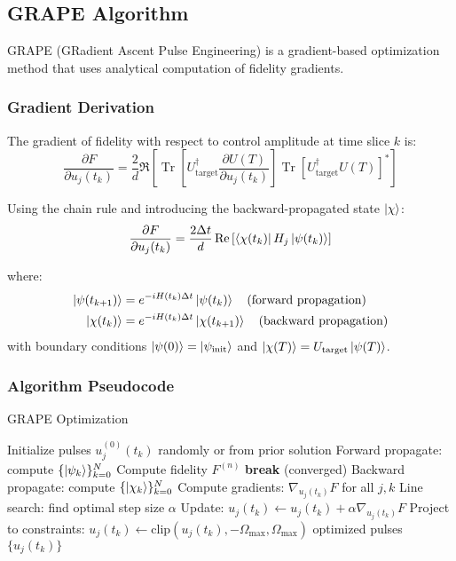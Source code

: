 \documentclass[11pt,a4paper]{article}
\theoremstyle{definition}
\theoremstyle{remark}
\renewcommand{\Tr}{\operatorname{Tr}}
\begin{document}
\subsection{GRAPE Algorithm}

GRAPE (GRadient Ascent Pulse Engineering) is a gradient-based optimization method that uses analytical computation of fidelity gradients.

\subsubsection{Gradient Derivation}

The gradient of fidelity with respect to control amplitude at time slice $k$ is:
\begin{equation}
\frac{\partial F}{\partial u_j(t_k)} = \frac{2}{d}\Re\left[\Tr\left[U_{\text{target}}^\dagger \frac{\partial U(T)}{\partial u_j(t_k)}\right]\Tr\left[U_{\text{target}}^\dagger U(T)\right]^*\right]
\end{equation}

Using the chain rule and introducing the backward-propagated state $\ket{\chi}$:
\begin{equation}
\frac{\partial F}{\partial u_j(t_k)} = \frac{2\Delta t}{d}\Re\left[\bra{\chi(t_k)}H_j\ket{\psi(t_k)}\right]
\end{equation}

where:
\begin{align}
\ket{\psi(t_{k+1})} &= e^{-iH(t_k)\Delta t}\ket{\psi(t_k)} \quad \text{(forward propagation)} \\
\ket{\chi(t_k)} &= e^{-iH(t_k)\Delta t}\ket{\chi(t_{k+1})} \quad \text{(backward propagation)}
\end{align}
with boundary conditions $\ket{\psi(0)} = \ket{\psi_{\text{init}}}$ and $\ket{\chi(T)} = U_{\text{target}}\ket{\psi(T)}$.

\subsubsection{Algorithm Pseudocode}

\begin{algorithm}
\caption{GRAPE Optimization}
\begin{algorithmic}[1]
\STATE Initialize pulses $u_j^{(0)}(t_k)$ randomly or from prior solution
    \STATE Forward propagate: compute $\{\ket{\psi_k}\}_{k=0}^N$
    \STATE Compute fidelity $F^{(n)}$
        \STATE \textbf{break} (converged)
    \ENDIF
    \STATE Backward propagate: compute $\{\ket{\chi_k}\}_{k=0}^N$
    \STATE Compute gradients: $\nabla_{u_j(t_k)} F$ for all $j, k$
    \STATE Line search: find optimal step size $\alpha$
    \STATE Update: $u_j(t_k) \leftarrow u_j(t_k) + \alpha \nabla_{u_j(t_k)} F$
    \STATE Project to constraints: $u_j(t_k) \leftarrow \text{clip}(u_j(t_k), -\Omega_{\max}, \Omega_{\max})$
\ENDFOR
\RETURN optimized pulses $\{u_j(t_k)\}$
\end{algorithmic}
\end{algorithm}
\end{document}
